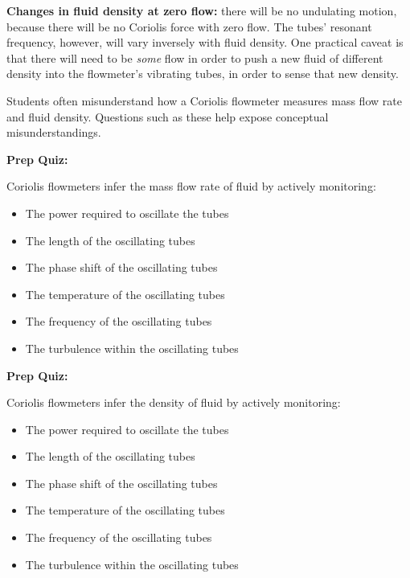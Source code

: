\vskip 10pt

{\bf Changes in fluid density at zero flow:} there will be no undulating motion, because there will be no Coriolis force with zero flow.  The tubes' resonant frequency, however, will vary inversely with fluid density.  One practical caveat is that there will need to be {\it some} flow in order to push a new fluid of different density into the flowmeter's vibrating tubes, in order to sense that new density.







Students often misunderstand how a Coriolis flowmeter measures mass flow rate and fluid density.  Questions such as these help expose conceptual misunderstandings.










\vfil \eject

\noindent
{\bf Prep Quiz:}

Coriolis flowmeters infer the mass flow rate of fluid by actively monitoring:

\begin{itemize}
\item{} The power required to oscillate the tubes
\vskip 5pt 
\item{} The length of the oscillating tubes
\vskip 5pt 
\item{} The phase shift of the oscillating tubes
\vskip 5pt 
\item{} The temperature of the oscillating tubes
\vskip 5pt 
\item{} The frequency of the oscillating tubes
\vskip 5pt 
\item{} The turbulence within the oscillating tubes
\end{itemize}











\vfil \eject

\noindent
{\bf Prep Quiz:}

Coriolis flowmeters infer the density of fluid by actively monitoring:

\begin{itemize}
\item{} The power required to oscillate the tubes
\vskip 5pt 
\item{} The length of the oscillating tubes
\vskip 5pt 
\item{} The phase shift of the oscillating tubes
\vskip 5pt 
\item{} The temperature of the oscillating tubes
\vskip 5pt 
\item{} The frequency of the oscillating tubes
\vskip 5pt 
\item{} The turbulence within the oscillating tubes
\end{itemize}






